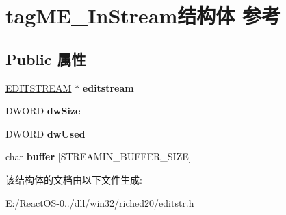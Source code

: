 \hypertarget{structtag_m_e___in_stream}{}\section{tag\+M\+E\+\_\+\+In\+Stream结构体 参考}
\label{structtag_m_e___in_stream}
\subsection*{Public 属性}
\begin{DoxyCompactItemize}
\item 
\mbox{\label{structtag_m_e___in_stream_a26590cbe425ad56493349621383b89fd}} 
\hyperlink{struct__editstream}{E\+D\+I\+T\+S\+T\+R\+E\+AM} $\ast$ {\bfseries editstream}
\item 
\mbox{\label{structtag_m_e___in_stream_af4b85f50bdb07db282f4ee3ac0524b43}} 
D\+W\+O\+RD {\bfseries dw\+Size}
\item 
\mbox{\label{structtag_m_e___in_stream_ad513770d6559abf2cc558e27cc5f7c9b}} 
D\+W\+O\+RD {\bfseries dw\+Used}
\item 
\mbox{\label{structtag_m_e___in_stream_a2a1862096d05c012088377437e9c2b64}} 
char {\bfseries buffer} \mbox{[}S\+T\+R\+E\+A\+M\+I\+N\+\_\+\+B\+U\+F\+F\+E\+R\+\_\+\+S\+I\+ZE\mbox{]}
\end{DoxyCompactItemize}


该结构体的文档由以下文件生成\+:\begin{DoxyCompactItemize}
\item 
E\+:/\+React\+O\+S-\/0../dll/win32/riched20/editstr.\+h\end{DoxyCompactItemize}
